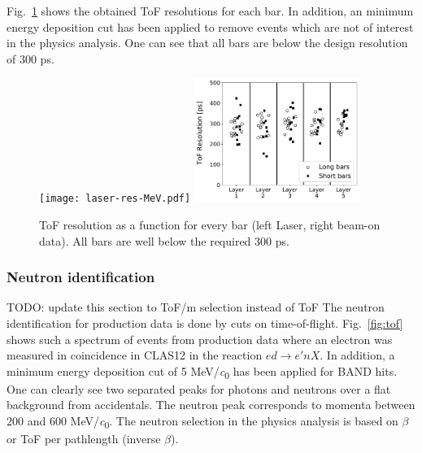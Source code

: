\documentclass[3p,final,twocolumn]{elsarticle}
\begin{document}
Fig.~\ref{fig:tof_resolution} shows the obtained ToF resolutions for each bar. 
In addition, an minimum energy deposition cut has been applied to remove events which are not of interest in the physics analysis. One can see that all bars are below the design resolution of
300 \si{\pico\s}. 
\begin{figure}[tb]
	\centering
			\texttt{[image: laser-res-MeV.pdf]}
		\includegraphics[width=0.48\textwidth]{tof-resolutions-photons-2MeV.pdf}
	\caption{ToF resolution as a function for every bar (left Laser, right beam-on data). All bars are well below the required 300 \si{\pico\s}. }
	\label{fig:tof_resolution}
\end{figure}


\subsubsection{Neutron identification}
\label{sec:neutronidentification}
{\color{red}  TODO: update this section to ToF/m selection instead of ToF}
The neutron identification for production data is done by cuts on time-of-flight. Fig.~\ref{fig:tof} shows such a spectrum of events from production data where an electron was measured in coincidence in CLAS12 in the reaction $ed \rightarrow e'nX$. In addition, a minimum energy deposition cut of 5 \si{\MeV/\clight} has been applied for BAND hits. One can clearly see two separated peaks for photons and neutrons over a flat background from accidentals. The neutron peak corresponds to momenta between $200$ and $600$ \si{\MeV/\clight}.
The neutron selection in the physics analysis is based on $\beta$ or ToF per pathlength (inverse $\beta$).
\end{document}
